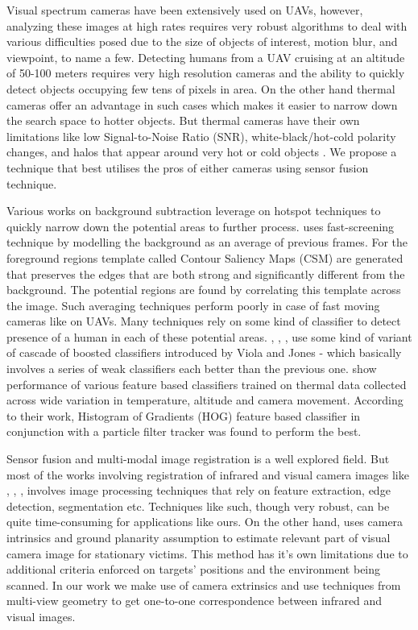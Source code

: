 \documentclass[runningheads]{llncs}
\begin{document}
Visual spectrum cameras have been extensively used on UAVs, however, analyzing these images at high rates requires very robust algorithms to deal with various difficulties posed due to the size of objects of interest, motion blur, and viewpoint, to name a few. Detecting humans from a UAV cruising at an altitude of 50-100 meters requires very high resolution cameras and the ability to quickly detect objects occupying few tens of pixels in area. On the other hand thermal cameras offer an advantage in such cases which makes it easier to narrow down the search space to hotter objects. But thermal cameras have their own limitations like low Signal-to-Noise Ratio (SNR), white-black/hot-cold polarity changes, and halos that appear around very hot or cold objects \cite{wang2010improved}. We propose a technique that best utilises the pros of either cameras using sensor fusion technique.

Various works on background subtraction leverage on hotspot techniques to quickly narrow down the potential areas to further process. \cite{davis2005two} uses fast-screening technique by modelling the background as an average of previous frames. For the foreground regions template called Contour Saliency Maps (CSM) are generated that preserves the edges that are both strong and significantly different from the background. The potential regions are found by correlating this template across the image. Such averaging techniques perform poorly in case of fast moving cameras like on UAVs. Many techniques rely on some kind of classifier to detect presence of a human in each of these potential areas. \cite{davis2005two}, \cite{1545530}, \cite{rudol2008human}, \cite{wang2010improved} use some kind of variant of cascade of boosted classifiers introduced by Viola and Jones \cite{viola2001rapid} - which basically involves a series of weak classifiers each better than the previous one. \cite{portmann2014people} show performance of various feature based classifiers trained on thermal data collected across wide variation in temperature, altitude and camera movement. According to their work, Histogram of Gradients (HOG) feature based classifier in conjunction with a particle filter tracker was found to perform the best.

Sensor fusion and multi-modal image registration is a well explored field. But most of the works involving registration of infrared and visual camera images like \cite{doi:10.1117/12.7977034}, \cite{1384918}, \cite{4381164}, \cite{3911} involves image processing techniques that rely on feature extraction, edge detection, segmentation etc. Techniques like such, though very robust, can be quite time-consuming for applications like ours. On the other hand, \cite{rudol2008human} uses camera intrinsics and ground planarity assumption to estimate relevant part of visual camera image for stationary victims. This method has it's own limitations due to additional criteria enforced on targets' positions and the environment being scanned. In our work we make use of camera extrinsics and use techniques from multi-view geometry to get one-to-one correspondence between infrared and visual images.
\end{document}
